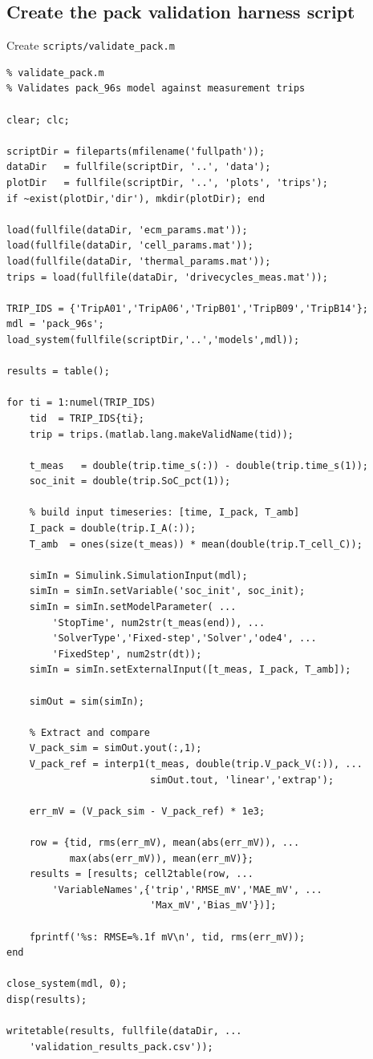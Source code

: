 \documentclass[11pt,a4paper]{article}
\begin{document}
\subsection{Create the pack validation harness script}

\begin{scriptbox}{Create \texttt{scripts/validate\_pack.m}}
\begin{verbatim}
% validate_pack.m
% Validates pack_96s model against measurement trips

clear; clc;

scriptDir = fileparts(mfilename('fullpath'));
dataDir   = fullfile(scriptDir, '..', 'data');
plotDir   = fullfile(scriptDir, '..', 'plots', 'trips');
if ~exist(plotDir,'dir'), mkdir(plotDir); end

load(fullfile(dataDir, 'ecm_params.mat'));
load(fullfile(dataDir, 'cell_params.mat'));
load(fullfile(dataDir, 'thermal_params.mat'));
trips = load(fullfile(dataDir, 'drivecycles_meas.mat'));

TRIP_IDS = {'TripA01','TripA06','TripB01','TripB09','TripB14'};
mdl = 'pack_96s';
load_system(fullfile(scriptDir,'..','models',mdl));

results = table();

for ti = 1:numel(TRIP_IDS)
    tid  = TRIP_IDS{ti};
    trip = trips.(matlab.lang.makeValidName(tid));

    t_meas   = double(trip.time_s(:)) - double(trip.time_s(1));
    soc_init = double(trip.SoC_pct(1));

    % build input timeseries: [time, I_pack, T_amb]
    I_pack = double(trip.I_A(:));
    T_amb  = ones(size(t_meas)) * mean(double(trip.T_cell_C));

    simIn = Simulink.SimulationInput(mdl);
    simIn = simIn.setVariable('soc_init', soc_init);
    simIn = simIn.setModelParameter( ...
        'StopTime', num2str(t_meas(end)), ...
        'SolverType','Fixed-step','Solver','ode4', ...
        'FixedStep', num2str(dt));
    simIn = simIn.setExternalInput([t_meas, I_pack, T_amb]);

    simOut = sim(simIn);

    % Extract and compare
    V_pack_sim = simOut.yout(:,1);
    V_pack_ref = interp1(t_meas, double(trip.V_pack_V(:)), ...
                         simOut.tout, 'linear','extrap');

    err_mV = (V_pack_sim - V_pack_ref) * 1e3;

    row = {tid, rms(err_mV), mean(abs(err_mV)), ...
           max(abs(err_mV)), mean(err_mV)};
    results = [results; cell2table(row, ...
        'VariableNames',{'trip','RMSE_mV','MAE_mV', ...
                         'Max_mV','Bias_mV'})];

    fprintf('%s: RMSE=%.1f mV\n', tid, rms(err_mV));
end

close_system(mdl, 0);
disp(results);

writetable(results, fullfile(dataDir, ...
    'validation_results_pack.csv'));
\end{verbatim}
\end{scriptbox}
\end{document}
